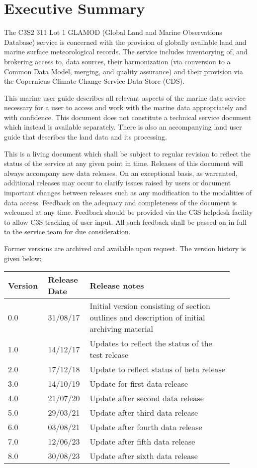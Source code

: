 \section*{Executive Summary}

The C3S2 311 Lot 1 GLAMOD (Global Land and Marine Observations Database) service is concerned with the provision of globally available land and marine surface meteorological records. 
The service includes inventorying of, and brokering access to, data sources, their harmonization (via conversion to a Common Data Model, merging, and quality assurance) and their provision via the Copernicus Climate Change Service Data Store (CDS).

This marine user guide describes all relevant aspects of the marine data service necessary for a user to access and work with the marine data appropriately and with confidence. 
This document does not constitute a technical service document which instead is available separately. 
There is also an accompanying land user guide that describes the land data and its processing.

This is a living document which shall be subject to regular revision to reflect the status of the service at any given point in time. Releases of this document will always accompany new data releases. On an exceptional basis, as warranted, additional releases may occur to clarify issues raised by users or document important changes between releases such as any modification to the modalities of data access. Feedback on the adequacy and completeness of the document is welcomed at any time. Feedback should be provided via the C3S helpdesk facility to allow C3S tracking of user input. All such feedback shall be passed on in full to the service team for due consideration.

Former versions are archived and available upon request. The version history is given below:

\begin{table}[h]
\begin{tabular}{|p{0.15\linewidth}|p{0.15\linewidth}|p{0.60\linewidth}|}
\hline
\bfseries Version & \bfseries Release Date & \bfseries Release notes \\\hline
0.0	& 31/08/17	& Initial version consisting of section outlines and description of initial archiving material \\\hline
1.0	& 14/12/17	& Updates to reflect the status of the test release \\\hline
2.0	& 17/12/18	& Update to reflect status of beta release \\\hline
3.0	& 14/10/19	& Update for first data release \\\hline
4.0	& 21/07/20	& Update after second data release \\\hline
5.0 & 29/03/21  & Update after third data release \\\hline
6.0 & 03/08/21  & Update after fourth data release \\\hline
7.0 & 12/06/23  & Update after fifth data release \\\hline
8.0 & 30/08/23  & Update after sixth data release \\\hline
\end{tabular}
\end{table}
\FloatBarrier
